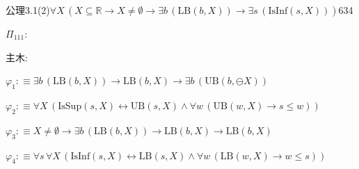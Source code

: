 \begin{fullproof}{公理3.1(2)}{$\forall X\,(X \subseteq \mathbb{R} \to X \neq \emptyset \to \exists b\,(\mathrm{LB}(b,X)) \to \exists s\,(\mathrm{IsInf}(s,X)))$}{634}
\begin{ptree}
\noLine
{}
\noLine
{}
\end{ptree}
\noindent$\Pi_{111}$:
\begin{ptree}
\noLine
{}
\noLine
{}
\end{ptree}
\noindent 主木:
\begin{ptree}
\noLine
{}
\noLine
{}
\end{ptree}
\begin{abbrevlist}
\item $\varphi_{1} :\equiv \exists b\,(\mathrm{LB}(b,X)) \to \mathrm{LB}(b,X) \to \exists b\,(\mathrm{UB}(b,\ominus X))$
\item $\varphi_{2} :\equiv \forall X\,(\mathrm{IsSup}(s,X) \leftrightarrow \mathrm{UB}(s,X) \land \forall w\,(\mathrm{UB}(w,X) \to s \leq w))$
\item $\varphi_{3} :\equiv X \neq \emptyset \to \exists b\,(\mathrm{LB}(b,X)) \to \mathrm{LB}(b,X) \to \mathrm{LB}(b,X)$
\item $\varphi_{4} :\equiv \forall s\,\forall X\,(\mathrm{IsInf}(s,X) \leftrightarrow \mathrm{LB}(s,X) \land \forall w\,(\mathrm{LB}(w,X) \to w \leq s))$

\end{abbrevlist}
\end{fullproof}
